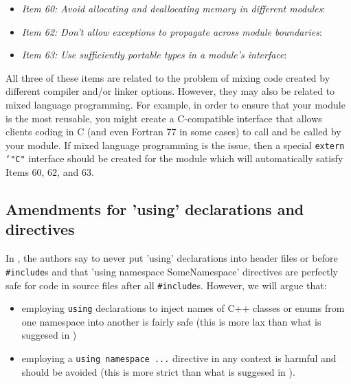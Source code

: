 \begin{itemize}

{}\item\textit{Item 60: Avoid allocating and deallocating memory in different
modules}:

{}\item\textit{Item 62: Don't allow exceptions to propagate across module
boundaries}:

{}\item\textit{Item 63: Use sufficiently portable types in a module's
interface}:

\end{itemize}

All three of these items are related to the problem of mixing code created by
different compiler and/or linker options.  However, they may also be related
to mixed language programming.  For example, in order to ensure that your
module is the most reusable, you might create a C-compatible interface that
allows clients coding in C (and even Fortran 77 in some cases) to call and be
called by your module.  If mixed language programming is the issue, then a
special {}\texttt{extern `"C"} interface should be created for the module
which will automatically satisfy Items 60, 62, and 63.

%
\subsection{Amendments for 'using' declarations and directives}
%

In {}\cite[Item 59]{C++CodingStandards05}, the authors say to never put
'using' declarations into header files or before {}\texttt{\#include}s and
that 'using namespace SomeNamespace' directives are perfectly safe for code in
source files after all {}\texttt{\#include}s.  However, we will argue that:

\begin{itemize}

{}\item{}employing {}\texttt{using} declarations to inject names of C++
classes or enums from one namespace into another is fairly safe (this is more
lax than what is suggesed in {}\cite[Item 59]{C++CodingStandards05})

{}\item{}employing a {}\texttt{using namespace ...} directive in any context
is harmful and should be avoided (this is more strict than what is suggesed in
{}\cite[Item 59]{C++CodingStandards05}).

\end{itemize}


